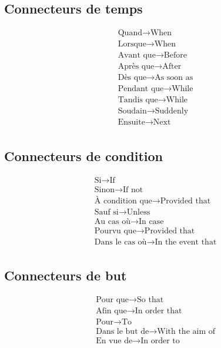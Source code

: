 \documentclass[12pt, a4paper]{article}
\begin{document}
\begin{multicols*}{3}
\subsection{Connecteurs de temps}
\vspace{-10pt}
\begin{align*}
  &\text{Quand} \rightarrow \text{When}\\
  &\text{Lorsque} \rightarrow \text{When}\\
  &\text{Avant que} \rightarrow \text{Before}\\
  &\text{Après que} \rightarrow \text{After}\\
  &\text{Dès que} \rightarrow \text{As soon as}\\
  &\text{Pendant que} \rightarrow \text{While}\\
  &\text{Tandis que} \rightarrow \text{While}\\
  &\text{Soudain} \rightarrow \text{Suddenly}\\
  &\text{Ensuite} \rightarrow \text{Next}\\
\end{align*}
\vspace{-40pt}

\subsection{Connecteurs de condition}
\vspace{-10pt}
\begin{align*}
  &\text{Si} \rightarrow \text{If}\\
  &\text{Sinon} \rightarrow \text{If not}\\
  &\text{À condition que} \rightarrow \text{Provided that}\\
  &\text{Sauf si} \rightarrow \text{Unless}\\
  &\text{Au cas où} \rightarrow \text{In case}\\
  &\text{Pourvu que} \rightarrow \text{Provided that}\\
  &\text{Dans le cas où} \rightarrow \text{In the event that}\\
\end{align*}
\vspace{-40pt}

\subsection{Connecteurs de but}
\vspace{-10pt}
\begin{align*}
  &\text{Pour que} \rightarrow \text{So that}\\
  &\text{Afin que} \rightarrow \text{In order that}\\
  &\text{Pour} \rightarrow \text{To}\\
  &\text{Dans le but de} \rightarrow \text{With the aim of}\\
  &\text{En vue de} \rightarrow \text{In order to}\\
\end{align*}
\vspace{-40pt}


\end{multicols*}
\end{document}
